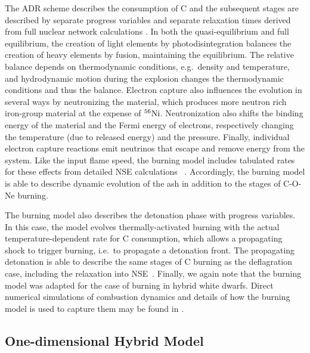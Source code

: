 \documentclass[preprint2]{aastex63}
\newcommand{\Ni}[1]{\ensuremath{{}^{#1}{\rm Ni}}}
\begin{document}
The ADR scheme describes the consumption of C and the subsequent stages
are described by separate progress variables and
separate relaxation times derived from full nuclear network calculations
\cite{Caldetal07,townetal2016}. In both the quasi-equilibrium and full equilibrium,
the creation of light elements by photodisintegration balances the creation of heavy
elements by fusion, maintaining the equilibrium. The relative balance depends on
thermodynamic conditions, e.g.\ density and temperature, and hydrodynamic motion
during the explosion changes the thermodynamic conditions and thus the
balance.
Electron capture also influences the evolution in several ways by
neutronizing the material, which produces more neutron rich iron-group
material at the expense of \Ni{56}. Neutronization also shifts the binding
energy of the material and the Fermi energy of electrons, respectively
changing the temperature (due to released energy) and the pressure.
Finally, individual electron capture reactions emit neutrinos that
escape and remove energy from the system.
Like the input flame speed, the burning model includes tabulated rates for these effects
from detailed NSE calculations ~\citep{SeitTownetal09}. Accordingly, the burning
model is able to describe dynamic evolution of the ash in addition to the
stages of C-O-Ne burning.

The burning model also describes the detonation phase with progress variables.
In this case, the model evolves thermally-activated burning with the actual
temperature-dependent rate for C consumption, which allows a propagating shock to
trigger burning, i.e.\ to propagate a detonation front. The propagating detonation
is able to describe the same stages of C burning as the deflagration case, including
the relaxation into NSE~\cite[and references therein]{townetal2016}. Finally,
we again note that the burning model was adapted for the case of burning in
hybrid white dwarfs.
Direct numerical simulations of combustion dynamics and details of how the burning model is used to capture them may be found in \citet{willcoxetal2016}.

\subsection{One-dimensional Hybrid Model}
\end{document}

